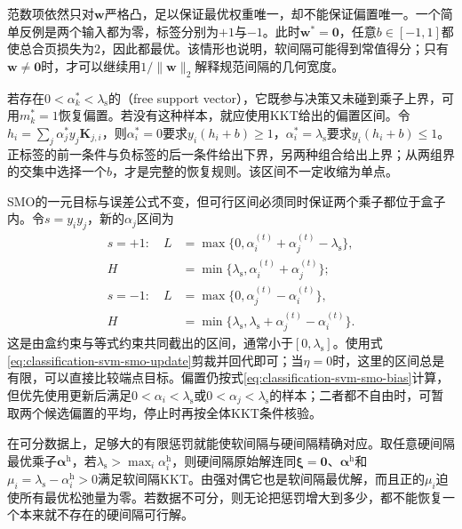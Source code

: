 范数项依然只对$\bm{w}$严格凸，足以保证最优权重唯一，却不能保证偏置唯一。一个简单反例是两个输入都为零，标签分别为$+1$与$-1$。此时$\bm{w}^{\ast}=\bm{0}$，任意$b\in[-1,1]$都使总合页损失为$2$，因此都最优。该情形也说明，软间隔可能得到常值得分；只有$\bm{w}\ne\bm{0}$时，才可以继续用$1/\lVert\bm{w}\rVert_2$解释规范间隔的几何宽度。

若存在$0<\alpha_k^{\ast}<\lambda_{\mathrm{s}}$的（free support vector），它既参与决策又未碰到乘子上界，可用$m_k^{\ast}=1$恢复偏置。若没有这种样本，就应使用KKT给出的偏置区间。令$h_i=\sum_j\alpha_j^{\ast}y_j\bm{K}_{j,i}$，则$\alpha_i^{\ast}=0$要求$y_i(h_i+b)\ge1$，$\alpha_i^{\ast}=\lambda_{\mathrm{s}}$要求$y_i(h_i+b)\le1$。正标签的前一条件与负标签的后一条件给出下界，另两种组合给出上界；从两组界的交集中选择一个$b$，才是完整的恢复规则。该区间不一定收缩为单点。

SMO的一元目标与误差公式不变，但可行区间必须同时保证两个乘子都位于盒子内。令$s=y_i y_j$，新的$\alpha_j$区间为
\begin{equation}
  \begin{aligned}
    s=+1:\quad
    L&=\max\{0,\alpha_i^{(t)}+\alpha_j^{(t)}
                    -\lambda_{\mathrm{s}}\},\\
    H&=\min\{\lambda_{\mathrm{s}},
                    \alpha_i^{(t)}+\alpha_j^{(t)}\};\\
    s=-1:\quad
    L&=\max\{0,\alpha_j^{(t)}-\alpha_i^{(t)}\},\\
    H&=\min\{\lambda_{\mathrm{s}},
           \lambda_{\mathrm{s}}+\alpha_j^{(t)}-\alpha_i^{(t)}\}.
  \end{aligned}
  \label{eq:classification-svm-smo-soft-interval}
\end{equation}
这是由盒约束与等式约束共同截出的区间，通常小于$[0,\lambda_{\mathrm{s}}]$。使用式\eqref{eq:classification-svm-smo-update}剪裁并回代即可；当$\eta=0$时，这里的区间总是有限，可以直接比较端点目标。偏置仍按式\eqref{eq:classification-svm-smo-bias}计算，但优先使用更新后满足$0<\alpha_i<\lambda_{\mathrm{s}}$或$0<\alpha_j<\lambda_{\mathrm{s}}$的样本；二者都不自由时，可暂取两个候选偏置的平均，停止时再按全体KKT条件核验。

在可分数据上，足够大的有限惩罚就能使软间隔与硬间隔精确对应。取任意硬间隔最优乘子$\bm{\alpha}^{\mathrm{h}}$，若$\lambda_{\mathrm{s}}>\max_i\alpha_i^{\mathrm{h}}$，则硬间隔原始解连同$\bm{\xi}=\bm{0}$、$\bm{\alpha}^{\mathrm{h}}$和$\mu_i=\lambda_{\mathrm{s}}-\alpha_i^{\mathrm{h}}>0$满足软间隔KKT。由强对偶它也是软间隔最优解，而且正的$\mu_i$迫使所有最优松弛量为零。若数据不可分，则无论把惩罚增大到多少，都不能恢复一个本来就不存在的硬间隔可行解。

